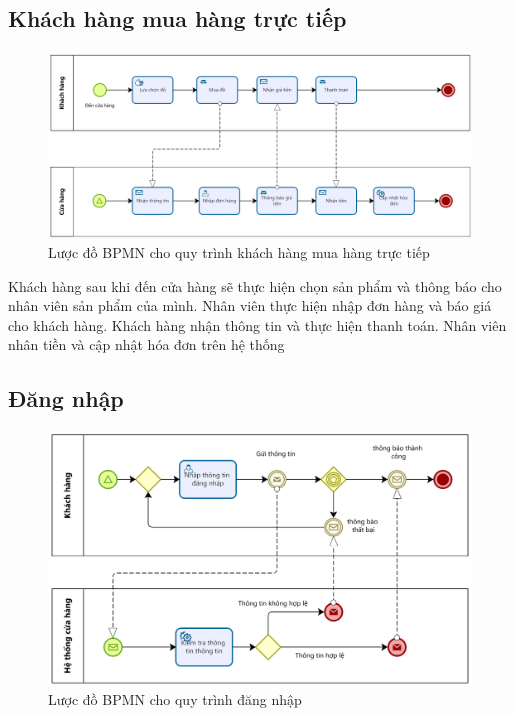 \subsection{Khách hàng mua hàng trực tiếp}
\begin{figure}[!htp]
	\centering
	\includegraphics[width=14cm]{img/BPMN/Hien/Customer_buyOffline.png}
	\newline
	\caption{Lược đồ BPMN cho quy trình khách hàng mua hàng trực tiếp}
\end{figure}

Khách hàng sau khi đến cửa hàng sẽ thực hiện chọn sản phẩm và thông báo cho nhân viên sản phẩm của mình. Nhân viên thực hiện nhập đơn hàng và báo giá cho khách hàng. Khách hàng nhận thông tin và thực hiện thanh toán. Nhân viên nhân tiền và cập nhật hóa đơn trên hệ thống

\subsection{Đăng nhập}
\begin{figure}[!htp]
	\centering
	\includegraphics[width=14cm]{img/BPMN/Hien/Customer_login.png}
	\newline
	\caption{Lược đồ BPMN cho quy trình đăng nhập}
\end{figure}

